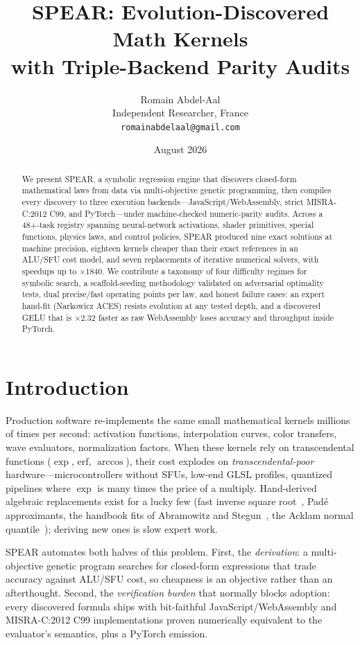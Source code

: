 \documentclass[11pt]{article}
\title{SPEAR: Evolution-Discovered Math Kernels\\ with Triple-Backend Parity Audits}
\author{Romain Abdel-Aal\\ Independent Researcher, France\\ \texttt{romainabdelaal@gmail.com}}
\date{August 2026}
\begin{document}
\maketitle

\begin{abstract}
We present SPEAR, a symbolic regression engine that discovers closed-form mathematical laws from data via multi-objective genetic programming, then compiles every discovery to three execution backends---JavaScript/WebAssembly, strict MISRA-C:2012 C99, and PyTorch---under machine-checked numeric-parity audits. Across a 48+-task registry spanning neural-network activations, shader primitives, special functions, physics laws, and control policies, SPEAR produced nine exact solutions at machine precision, eighteen kernels cheaper than their exact references in an ALU/SFU cost model, and seven replacements of iterative numerical solvers, with speedups up to $\times1840$. We contribute a taxonomy of four difficulty regimes for symbolic search, a scaffold-seeding methodology validated on adversarial optimality tests, dual precise/fast operating points per law, and honest failure cases: an expert hand-fit (Narkowicz ACES) resists evolution at any tested depth, and a discovered GELU that is $\times2.32$ faster as raw WebAssembly loses accuracy and throughput inside PyTorch.
\end{abstract}

\section{Introduction}
Production software re-implements the same small mathematical kernels millions of times per second: activation functions, interpolation curves, color transfers, wave evaluators, normalization factors. When these kernels rely on transcendental functions ($\exp$, $\mathrm{erf}$, $\arccos$), their cost explodes on \emph{transcendental-poor} hardware---microcontrollers without SFUs, low-end GLSL profiles, quantized pipelines where $\exp$ is many times the price of a multiply. Hand-derived algebraic replacements exist for a lucky few (fast inverse square root~\cite{lomont2003invsqrt}, Pad\'e approximants, the handbook fits of Abramowitz and Stegun~\cite{abramowitz1964handbook}, the Acklam normal quantile~\cite{acklam2003invnorm}); deriving new ones is slow expert work.

SPEAR automates both halves of this problem. First, the \emph{derivation}: a multi-objective genetic program searches for closed-form expressions that trade accuracy against ALU/SFU cost, so cheapness is an objective rather than an afterthought. Second, the \emph{verification burden} that normally blocks adoption: every discovered formula ships with bit-faithful JavaScript/WebAssembly and MISRA-C:2012 C99 implementations proven numerically equivalent to the evaluator's semantics, plus a PyTorch emission.
\end{document}
